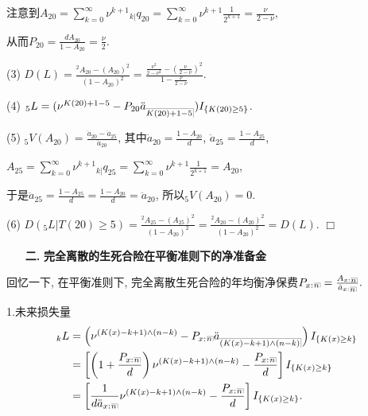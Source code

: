 \documentclass[a4paper,openany, 10pt]{ctexbook}
\makeatletter
\newcommand{\hei}{\CJKfamily{hei}}      %
\def\qed{\hfill$\Box$\medskip}
\def\z{\left}
\def\y{\right}
\DeclareRobustCommand{\annu}[1]{_{%
    \def\arraystretch{0}%
    \setlength\arraycolsep{1pt}%
    \setlength\arrayrulewidth{.2pt}%
    \begin{array}[b]{@{}c|}\hline
        \\[\arraycolsep]%
        \scriptstyle #1%
    \end{array}%
}}
\makeatother
\begin{document}
注意到$A_{20}=\sum_{k=0}^{\infty}\nu^{k+1}{}_{k|}q_{20} = \sum_{k=0}^{\infty}\nu^{k+1}\frac{1}{2^{k+1}} = \frac{\nu}{2-\nu}$, 

从而$P_{20}=\frac{dA_{20}}{1-A_{20}}=\frac{\nu}{2}.$

(3) $D(L)=\frac{^2A_{20}-(A_{20})^2}{(1-A_{20})^2}=\frac{\frac{\nu^{2}}{2-\nu^{2}}-\left(\frac{\nu}{2-\nu}\right)^{2}}{1-\frac{\nu}{2-\nu}}$.

(4) ${}_{5}L=(\nu^{K(20)+1-5}-P_{20}\ddot{a}_{\annu{K(20)+1-5}})I_{\{K(20)\geq 5\}}$.

(5) ${}_{5}V(A_{20})=\frac{\ddot{a}_{20}-\ddot{a}_{25}}{\ddot{a}_{20}}$, 其中$\ddot{a}_{20}=\frac{1-A_{20}}{d}$, $\ddot{a}_{25}=\frac{1-A_{25}}{d}$,

$A_{25}=\sum_{k=0}^{\infty}\nu^{k+1}{}_{k|}q_{25} = \sum_{k=0}^{\infty}\nu^{k+1}\frac{1}{2^{k+1}} = A_{20}$, 

于是$\ddot{a}_{25}=\frac{1-A_{25}}{d} = \frac{1-A_{20}}{d} = \ddot{a}_{20}$, 所以${}_{5}V(A_{20})=0$.

(6) $D({}_{5}L|T(20)\geq 5)=\frac{^2A_{25}-(A_{25})^2}{(1-A_{20})^2} = \frac{^2A_{20}-(A_{20})^2}{(1-A_{20})^2} = D(L)$.
\qed

\begin{itemize}
    \item[{\bf\hei 二.}]{\bf\hei 完全离散的生死合险在平衡准则下的净准备金}
\end{itemize}

回忆一下, 在平衡准则下, 完全离散生死合险的年均衡净保费$P_{x:}{}\annu{n}=\frac{A_{x:}{}\annu{n}}{\ddot a_{x:}{}\annu{n}}.$


1.未来损失量
\begin{align*}
    {}_kL&=\z(\nu^{(K(x)-k+1)\wedge (n-k)}-P_{x:}{}\annu{n} \ddot a_{\annu {(K(x)-k+1)\wedge (n-k)}}\y)I_{\{K(x)\ge k\}} \\
                        &=\z[\z(1+\frac{P_{x:}{}\annu{n} }{d}\y)\nu^{(K(x)-k+1)\wedge (n-k)}-\frac{P_{x:}{}\annu{n}}{d}\y] I_{\{K(x)\ge k\}}\\
                        &=\z[\frac{1}{d\ddot a_{x:}{}\annu{n}}\nu^{(K(x)-k+1)\wedge (n-k)}-\frac{P_{x:}{}\annu{n} }{d}\y]I_{\{K(x)\ge k\}}.
\end{align*}
\end{document}
